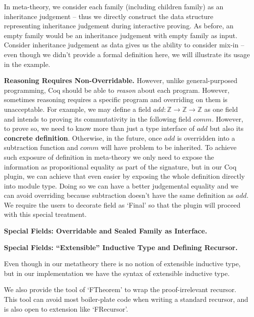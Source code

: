

In meta-theory, we consider each family (including children family) as an inheritance judgement -- thus we directly construct the data structure representing inheritance judgement during interactive proving. As before, an empty family would be an inheritance judgement with empty family as input. Consider inheritance judgement as data gives us the ability to consider mix-in -- even though we didn't provide a formal definition here, we will illustrate its usage in the example. 



\textbf{Reasoning Requires Non-Overridable.}
However, unlike general-purposed programming, Coq should be able to  \textit{reason} about each program. However, sometimes reasoning requires a specific program and overriding on them is unacceptable. For example, we may define a field $add : \mathbb{Z} \to \mathbb{Z} \to \mathbb{Z}$ as one field and intends to proving its commutativity in the following field $comm$. However, to prove so, we need to know more than just a type interface of $add$ but also its \textbf{concrete definition}. Otherwise, in the future, once $add$ is overridden into a subtraction function and $comm$ will have problem to be  inherited. To achieve such exposure of definition in meta-theory we only need to expose the information as propositional equality as part of the signature, but in our Coq plugin, we can achieve that even easier by exposing the whole definition directly into module type. Doing so we can have a better judgemental equality and we can avoid overriding because subtraction doesn't have the same definition as $add$. We require the users to decorate field as `Final' so that the plugin will proceed with this special treatment.

\textbf{Special Fields: Overridable and Sealed Family as Interface.}



\textbf{Special Fields: ``Extensible'' Inductive Type and Defining Recursor.}

Even though in our metatheory there is no notion of extensible inductive type, but in our implementation we have the syntax of extensible inductive type.

We also provide the tool of `FTheorem' to wrap the proof-irrelevant recursor. This tool can avoid most boiler-plate code when writing a standard recursor, and is also open to extension like `FRecursor'.

